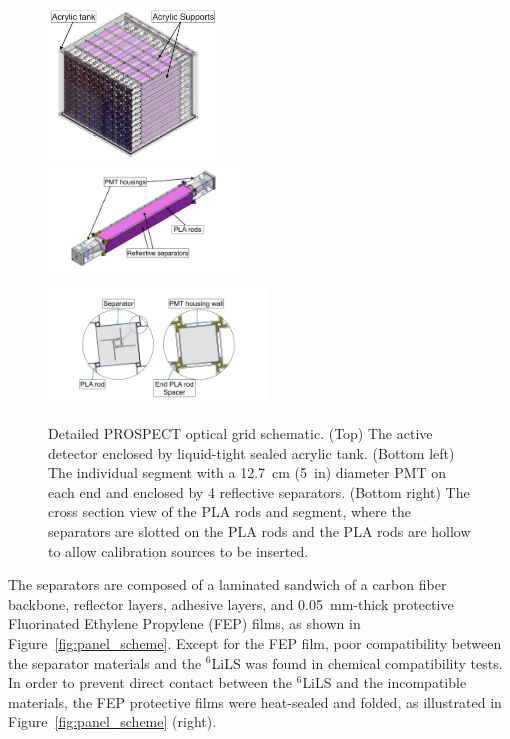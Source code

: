 \begin{figure}[h!]
\centering
\includegraphics[clip, width=0.4\textwidth]{Figures/DetailedDetector.png} \\
\includegraphics[trim = 2cm 2cm 2cm 2cm,clip, width=0.47\textwidth]{Figures/DetailedSegment.pdf} 
\includegraphics[trim = 2cm 2cm 2cm 2cm,clip, width=0.52\textwidth]{Figures/DetailedOGDesign.pdf}
\caption[Detailed PROSPECT optical grid schematic] {Detailed PROSPECT optical grid schematic. 
(Top) The active detector enclosed by liquid-tight sealed acrylic tank. 
(Bottom left) The individual segment with a 12.7~cm (5~in) diameter PMT on each end and enclosed by 4 reflective separators. 
(Bottom right) The cross section view of the PLA rods and segment, where the separators are slotted on the PLA rods and the PLA rods are hollow to allow calibration sources to be inserted.}
\label{fig:OGDesign}
\end{figure} 

The separators are composed of a laminated sandwich of a carbon fiber backbone, reflector layers, adhesive layers, and 0.05~mm-thick protective Fluorinated Ethylene Propylene (FEP)  films, as shown in Figure~\ref{fig:panel_scheme}.
Except for the FEP film, poor compatibility between the separator materials and the $^6$LiLS was found in chemical compatibility tests.
In order to prevent direct contact between the $^6$LiLS and the incompatible materials, the FEP protective films were heat-sealed and folded, as illustrated in Figure~\ref{fig:panel_scheme} (right).
	

